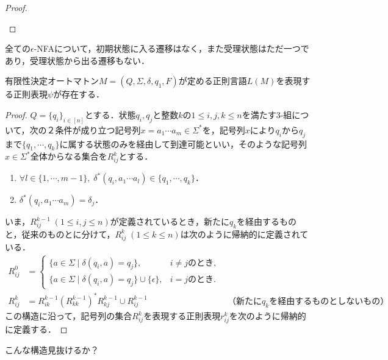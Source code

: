 \begin{proof}
\begin{enumerate}
\begin{center}
        \end{center}
    \end{enumerate}
\end{proof}
\begin{remarks}
    全ての$\epsilon$-NFAについて，初期状態に入る遷移はなく，また受理状態はただ一つであり，受理状態から出る遷移もない．
\end{remarks}

\begin{theorem}
    有限性決定オートマトン$M=(Q,\Sigma,\delta,q_1,F)$が定める正則言語$L(M)$を表現する正則表現$\psi$が存在する．
\end{theorem}
\begin{proof}
    $Q=\{q_i\}_{i\in[n]}$とする．状態$q_i,q_j$と整数$k$の$1\le i,j,k\le n$を満たす3-組について，次の２条件が成り立つ記号列$x=a_1\cdots a_m\in\Sigma^*$を，記号列$x$により$q_i$から$q_j$まで$\{q_1,\cdots,q_k\}$に属する状態のみを経由して到達可能といい，そのような記号列$x\in\Sigma^*$全体からなる集合を$R^k_{ij}$とする．
    \begin{enumerate}
        \item $\forall l\in\{1,\cdots,m-1\},\;\delta^*(q_i,a_1\cdots a_l)\in\{q_1,\cdots,q_k\}$．
        \item $\delta^*(q_i,a_1\cdots a_m)=\delta_j$．
    \end{enumerate}
    いま，$R^{k-1}_{ij}\;(1\le i,j\le n)$が定義されているとき，新たに$q_k$を経由するものと，従来のものとに分けて，$R^k_{ij}\;(1\le k\le n)$は次のように帰納的に定義されている．
    \begin{align*}
        R^0_{ij}&=\begin{cases}
            \{a\in\Sigma\mid \delta(q_i,a)=q_j\},&i\ne jのとき,\\
            \{a\in\Sigma\mid \delta(q_i,a)=q_j\}\cup\{\epsilon\},&i=jのとき.
        \end{cases}\\
        R^k_{ij}&=R^{k-1}_{ik}(R^{k-1}_{kk})^*R^{k-1}_{kj}\cup R^{k-1}_{ij}&（新たにq_kを経由するものとしないもの）
    \end{align*}
    この構造に沿って，記号列の集合$R^k_{ij}$を表現する正則表現$r^k_{ij}$を次のように帰納的に定義する．
\end{proof}
\begin{remarks}
    こんな構造見抜けるか？
\end{remarks}

